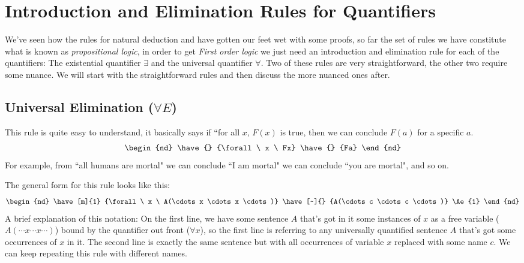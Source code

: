 \section{Introduction and Elimination Rules for Quantifiers}
We've seen how the rules for natural deduction and have gotten our feet wet with some proofs, so far the set of rules we have constitute what is known as \textit{propositional logic}, in order to get \textit{First order logic} we just need an introduction and elimination rule for each of the quantifiers: The existential quantifier $\exists$ and the universal quantifier $\forall$. Two of these rules are very straightforward, the other two require some nuance. We will start with the straightforward rules and then discuss the more nuanced ones after.

\subsection{Universal Elimination ($\forall E$)}
This rule is quite easy to understand, it basically says if ``for all $x$, $F(x)$ is true, then we can conclude $F(a)$ for a specific $a$.
\begin{equation}
    \begin{nd}
        \have{} {\forall \ x \ Fx}
        \have{} {Fa}
    \end{nd}\nonumber
\end{equation}
For example, from ``all humans are mortal" we can conclude ``I am mortal" we can conclude ``you are mortal", and so on.

The general form for this rule looks like this:
\begin{equation}
    \begin{nd}
        \have[m]{1} {\forall \ x \ A(\cdots x \cdots x \cdots)}
        \have[~]{} {A(\cdots c \cdots c \cdots)} \Ae{1}
    \end{nd}\nonumber
\end{equation}
A brief explanation of this notation: On the first line, we have some sentence $A$ that's got in it some instances of $x$ as a free variable ($A(\cdots x \cdots x \cdots)$) bound by the quantifier out front ($\forall x$), so the first line is referring to any universally quantified sentence $A$ that's got some occurrences of $x$ in it. The second line is exactly the same sentence but with all occurrences of variable $x$ replaced with some name $c$. We can keep repeating this rule with different names.

